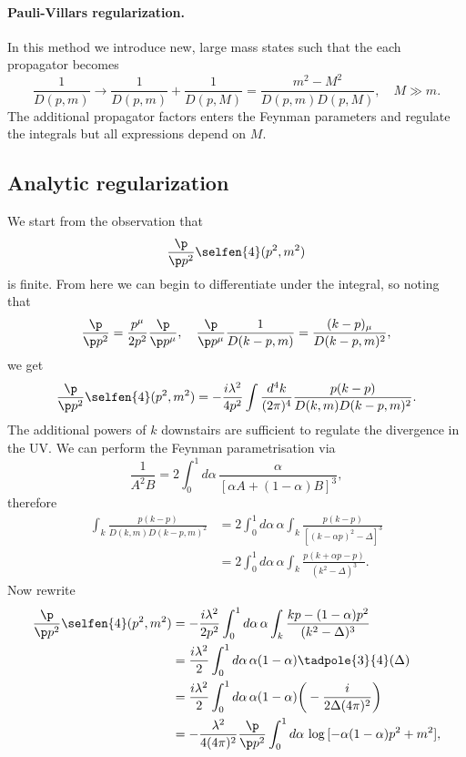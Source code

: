 \paragraph{Pauli-Villars regularization.} In this method we introduce new, large mass states such that the each propagator becomes
\begin{equation}
    \frac{1}{D(p,m)} \to \frac{1}{D(p,m)} + \frac{1}{D(p,M)} = \frac{m^2 - M^2}{D(p,m)D(p,M)},\quad M \gg m.
\end{equation}
The additional propagator factors enters the Feynman parameters and regulate the integrals but all expressions depend on $M$. 

\subsection{Analytic regularization}
We start from the observation that 
\begin{equation}
    \frac{\p}{\p p^2}\selfen{4}(p^2,m^2)
\end{equation}
is finite. From here we can begin to differentiate under the integral, so noting that 
\begin{equation}
    \frac{\p}{\p p^2} = \frac{p^\mu}{2p^2}\frac{\p}{\p p^\mu},\quad \frac{\p}{\p p^\mu}\frac{1}{D(k -p,m)} = \frac{(k - p)_\mu}{D(k - p,m)^2},
\end{equation}
we get
\begin{equation}
    \frac{\p}{\p p^2}\selfen{4}(p^2,m^2) = -\frac{i\lambda^2}{4p^2}\int \frac{d^4k}{(2\pi)^4}\frac{p(k - p)}{D(k,m)D(k - p,m)^2}.
\end{equation}
The additional powers of $k$ downstairs are sufficient to regulate the divergence in the UV. We can perform the Feynman parametrisation via
\begin{equation}
    \frac{1}{A^2B}  = 2\int_0^1 d\alpha\,\frac{\alpha}{[\alpha A + (1 - \alpha)B]^3},
\end{equation}
therefore
\begin{equation}
    \begin{split}
        \int_k\frac{p(k - p)}{D(k,m)D(k - p,m)^2} &= 2\int_0^1d\alpha\,\alpha\int_k\frac{p(k - p)}{[(k - \alpha p)^2 - \Delta]^3} \\
        &= 2\int_0^1d\alpha\,\alpha\int_k\frac{p(k + \alpha p - p)}{(k^2 - \Delta)^3}.
    \end{split}
\end{equation}
Now rewrite 
\begin{equation}
    \begin{split}
        \frac{\p}{\p p^2}\selfen{4}(p^2,m^2) &= -\frac{i\lambda^2}{2p^2}\int_0^1d\alpha\,\alpha\int_k\frac{kp - (1 - \alpha)p^2}{(k^2 - \Delta)^3} \\
        &= \frac{i\lambda^2}{2}\int_0^1d\alpha\,\alpha(1 - \alpha)\tadpole{3}{4}(\Delta) \\
        &= \frac{i\lambda^2}{2}\int_0^1d\alpha\,\alpha(1 - \alpha)\bigg(-\frac{i}{2\Delta(4\pi)^2}\bigg) \\
        &= -\frac{\lambda^2}{4(4\pi)^2}\frac{\p}{\p p^2}\int_0^1d\alpha\,\log{[-\alpha(1 - \alpha)p^2 + m^2]},
    \end{split}
\end{equation}

